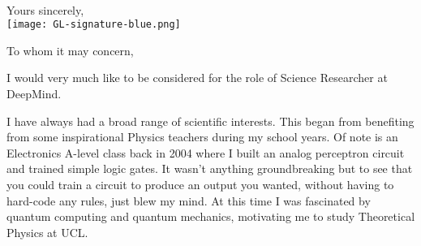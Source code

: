 \documentclass[11pt,a4paper,sans]{moderncv}        %
\begin{document}

\clearpage
\recipient{~}{~}
\date{\vspace*{-0cm}~}
\opening{\vspace*{-3cm}~}
\closing{Yours sincerely, \\ \hspace*{-0.3cm}
\texttt{[image: GL-signature-blue.png]} 
\vspace*{-1cm}
}
\makelettertitle
%
To whom it may concern,
%

I would very much like to be considered for the role of Science Researcher at DeepMind.

%
I have always had a broad range of scientific interests. 
This began from benefiting from some inspirational 
Physics teachers during my school years. Of note is an 
Electronics A-level class back in 2004 where I 
built an analog perceptron circuit and trained 
simple logic gates. It wasn't anything groundbreaking 
but to see that you could train a circuit to produce 
an output you wanted, without having to hard-code 
any rules, just blew my mind. 
%
At this time I was fascinated by quantum computing 
and quantum mechanics, motivating me to study 
Theoretical Physics at UCL.
%
\end{document}
